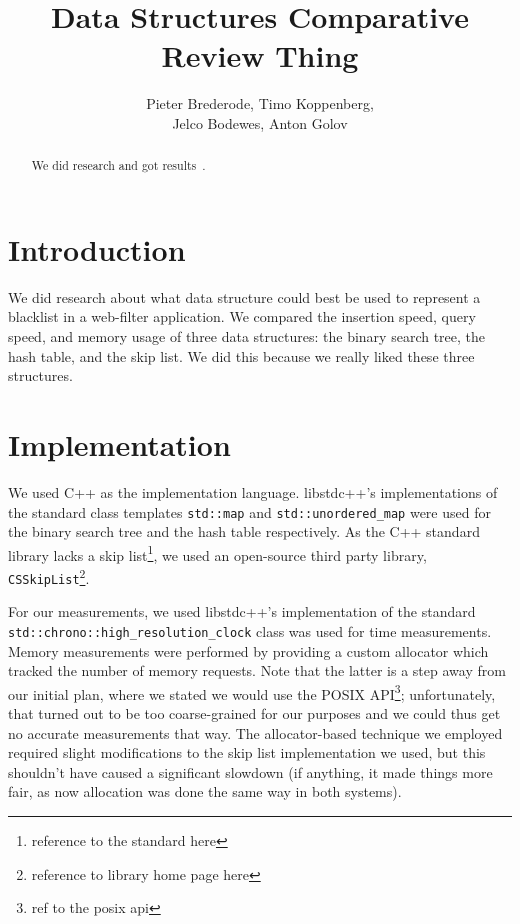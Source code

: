 \documentclass[12pt,a4paper]{article}
\title{Data Structures Comparative Review Thing}
\author{Pieter Brederode, Timo Koppenberg, \\ Jelco Bodewes, Anton Golov}
\begin{document}
    \maketitle

    \begin{abstract}
        We did research and got results~\cite{CallOfCthulhu}.
    \end{abstract}


    \section{Introduction}

    We did research about what data structure could best be used to represent a blacklist in a 
    web-filter application.  We compared the insertion speed, query speed, and memory usage of three
    data structures: the binary search tree, the hash table, and the skip list.  We did this because
    we really liked these three structures. 

    \section{Implementation}

    We used C++ as the implementation language.  libstdc++'s implementations of the standard
    class templates \texttt{std::map} and \texttt{std::unordered\_map} were used for the binary search
    tree and the hash table respectively.  As the C++ standard library lacks a skip list\footnote{reference to
    the standard here}, we used an open-source third party library, \texttt{CSSkipList}\footnote{reference to
    library home page here}.

    For our measurements, we used libstdc++'s implementation of the standard
    \texttt{std::chrono::high\_resolution\_clock} class was used for time measurements.   Memory
    measurements were performed by providing a custom allocator which tracked the number of memory
    requests.  Note that the latter is a step away from our initial plan, where we stated we would use
    the POSIX API\footnote{ref to the posix api}; unfortunately, that turned out to be too coarse-grained
    for our purposes and we could thus get no accurate measurements that way.  The allocator-based technique
    we employed required slight modifications to the skip list implementation we used, but this
    shouldn't have caused a significant slowdown (if anything, it made things more fair, as now allocation
    was done the same way in both systems).
\end{document}
